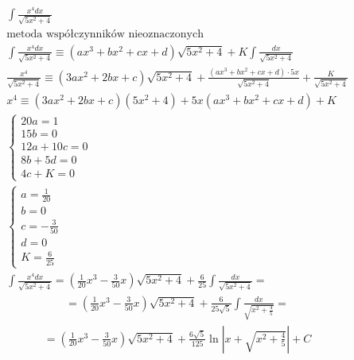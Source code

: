 \begin{gather*}
  \int \frac{x^4dx}{\sqrt{5x^2+4}} \\
  \text{metoda współczynników nieoznaczonych} \\
  \int \frac{x^4dx}{\sqrt{5x^2+4}} \equiv (ax^3+bx^2+cx+d)\sqrt{5x^2+4} + K\int \frac{dx}{\sqrt{5x^2+4}} \\
\frac{x^4}{\sqrt{5x^2+4}} \equiv (3ax^2+2bx+c)\sqrt{5x^2+4}+\frac{(ax^3+bx^2+cx+d)\cdot 5x}{\sqrt{5x^2+4}}+\frac{K}{\sqrt{5x^2+4}} \\
x^4 \equiv (3ax^2+2bx+c)(5x^2+4)+5x(ax^3+bx^2+cx+d)+K \\
\begin{cases} 20a=1 \\ 15b=0 \\ 12a+10c=0 \\ 8b+5d=0 \\ 4c+K=0 \end{cases} \\
\begin{cases} a=\frac{1}{20} \\ b=0 \\ c=-\frac{3}{50} \\ d=0 \\ K=\frac{6}{25} \end{cases} \\
\int \frac{x^4dx}{\sqrt{5x^2+4}} = (\frac{1}{20}x^3-\frac{3}{50} x)\sqrt{5x^2+4} + \frac{6}{25}\int \frac{dx}{\sqrt{5x^2+4}} = \end{gather*}
\begin{gather*}= (\frac{1}{20}x^3-\frac{3}{50} x)\sqrt{5x^2+4} + \frac{6}{25\sqrt{5}}\int \frac{dx}{\sqrt{x^2+\frac{4}{5}}} = \end{gather*}
\begin{gather*}= (\frac{1}{20}x^3-\frac{3}{50} x)\sqrt{5x^2+4} + \frac{6\sqrt{5}}{125}\ln|x+\sqrt{x^2+\frac{4}{5}}|+C\end{gather*}


